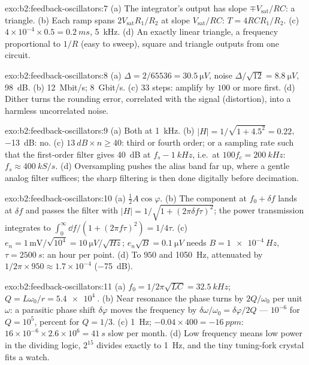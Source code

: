 \begin{solution}{exo:b2:feedback-oscillators:7}
(a) The integrator's output has slope $\mp V_{\text{sat}}/RC$: a triangle. (b)
Each ramp spans $2V_{\text{sat}}R_1/R_2$ at slope $V_{\text{sat}}/RC$: $T = 4RCR_1/R_2$.
(c) $4 \times 10^{-4} \times 0.5 = \qty{0.2}{ms}$, \qty{5}{kHz}. (d) An exactly linear
triangle, a frequency proportional to $1/R$ (easy to sweep), square and
triangle outputs from one circuit.
\end{solution}

\begin{solution}{exo:b2:feedback-oscillators:8}
(a) $\Delta = 2/65536 = \qty{30.5}{\micro V}$, noise $\Delta/\sqrt{12} = \qty{8.8}{\micro V}$,
\qty{98}{dB}. (b) \qty{12}{Mbit/s}; \qty{8}{Gbit/s}. (c) $33$ steps: amplify by
$100$ or more first. (d) Dither turns the rounding error, correlated
with the signal (distortion), into a harmless uncorrelated noise.
\end{solution}

\begin{solution}{exo:b2:feedback-oscillators:9}
(a) Both at \qty{1}{kHz}. (b) $|H| = 1/\sqrt{1 + 4.5^2} = 0.22$, \qty{-13}{dB}: no. (c)
$\qty{13}{dB} \times n \ge 40$: third or fourth order; or a sampling rate such
that the first-order filter gives \qty{40}{dB} at $f_s - \qty{1}{kHz}$, i.e.\ at
$100f_c = \qty{200}{kHz}$: $f_s \approx \qty{400}{kS/s}$. (d) Oversampling pushes the
alias band far up, where a gentle analog filter suffices; the sharp
filtering is then done digitally before decimation.
\end{solution}

\begin{solution}{exo:b2:feedback-oscillators:10}
(a) $\tfrac12A\cos\varphi$. (b) The component at $f_0 + \delta f$ lands at $\delta f$
and passes the filter with $|H| = 1/\sqrt{1 + (2\pi\delta f\tau)^2}$; the power
transmission integrates to $\int_0^\infty\dd f/(1 + (2\pi f\tau)^2) = 1/4\tau$.
(c) $e_n = 1\,\text{mV}/\sqrt{10^4} = \qty{10}{\micro V/\sqrt{Hz}}$; $e_n\sqrt B = \qty{0.1}{\micro V}$
needs $B = \qty{1e-4}{Hz}$, $\tau = \qty{2500}{s}$: an hour per point. (d) To $950$
and \qty{1050}{Hz}, attenuated by $1/2\pi \times 950 \approx 1.7 \times 10^{-4}$ (\qty{-75}{dB}).
\end{solution}

\begin{solution}{exo:b2:feedback-oscillators:11}
(a) $f_0 = 1/2\pi\sqrt{LC} = \qty{32.5}{kHz}$; $Q = L\omega_0/r = \qty{5.4e4}{}$. (b) Near
resonance the  phase turns by $2Q/\omega_0$ per unit $\omega$: a
parasitic phase shift $\delta\varphi$ moves the frequency by $\delta\omega/\omega_0 =
\delta\varphi/2Q$ --- $10^{-6}$ for $Q = 10^5$, percent for $Q = 1/3$. (c) \qty{1}{Hz};
$-0.04 \times 400 = \qty{-16}{ppm}$: $16 \times 10^{-6} \times 2.6 \times 10^6 = \qty{41}{s}$ slow per
month. (d) Low frequency means low power in the dividing logic, $2^{15}$
divides exactly to \qty{1}{Hz}, and the tiny tuning-fork crystal fits a
watch.
\end{solution}

